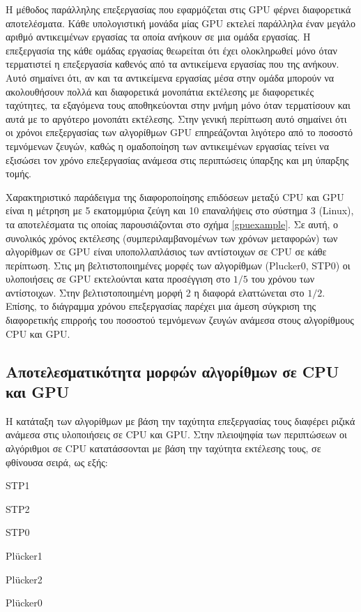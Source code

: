 Η μέθοδος παράλληλης επεξεργασίας που εφαρμόζεται στις GPU φέρνει διαφορετικά αποτελέσματα. Κάθε υπολογιστική μονάδα μίας GPU εκτελεί παράλληλα έναν μεγάλο αριθμό αντικειμένων εργασίας τα οποία ανήκουν σε μια ομάδα εργασίας. Η επεξεργασία της κάθε ομάδας εργασίας θεωρείται ότι έχει ολοκληρωθεί μόνο όταν τερματιστεί η επεξεργασία καθενός από τα αντικείμενα εργασίας που της ανήκουν. Αυτό σημαίνει ότι, αν και τα αντικείμενα εργασίας μέσα στην ομάδα μπορούν να ακολουθήσουν πολλά και διαφορετικά μονοπάτια εκτέλεσης με διαφορετικές ταχύτητες, τα εξαγόμενα τους αποθηκεύονται στην μνήμη μόνο όταν τερματίσουν και αυτά με το αργότερο μονοπάτι εκτέλεσης. Στην γενική περίπτωση αυτό σημαίνει ότι οι χρόνοι επεξεργασίας των αλγορίθμων GPU επηρεάζονται λιγότερο από το ποσοστό τεμνόμενων ζευγών, καθώς η ομαδοποίηση των αντικειμένων εργασίας τείνει να εξισώσει τον χρόνο επεξεργασίας ανάμεσα στις περιπτώσεις ύπαρξης και μη ύπαρξης τομής. 

Χαρακτηριστικό παράδειγμα της διαφοροποίησης επιδόσεων μεταξύ CPU και GPU είναι η μέτρηση με 5 εκατομμύρια ζεύγη και 10 επαναλήψεις στο σύστημα 3 (Linux), τα αποτελέσματα τις οποίας παρουσιάζονται στο σχήμα \ref{gpuexample}. Σε αυτή, ο συνολικός χρόνος εκτέλεσης (συμπεριλαμβανομένων των χρόνων μεταφορών) των αλγορίθμων σε GPU είναι υποπολλαπλάσιος των αντίστοιχων σε CPU σε κάθε περίπτωση. Στις μη βελτιστοποιημένες μορφές των αλγορίθμων (Plucker0, STP0) οι υλοποιήσεις σε GPU εκτελούνται κατα προσέγγιση στο $1/5$ του χρόνου των αντίστοιχων. Στην βελτιστοποιημένη μορφή 2 η διαφορά ελαττώνεται στο $1/2$. Επίσης, το διάγραμμα χρόνου επεξεργασίας παρέχει μια άμεση σύγκριση της διαφορετικής επιρροής του ποσοστού τεμνόμενων ζευγών ανάμεσα στους αλγορίθμους CPU και GPU.

\subsection{Αποτελεσματικότητα μορφών αλγορίθμων σε CPU και GPU}
\label{chapter:bench_algs}
\noindent Η κατάταξη των αλγορίθμων με βάση την ταχύτητα επεξεργασίας τους διαφέρει ριζικά ανάμεσα στις υλοποιήσεις σε CPU και GPU. Στην πλειοψηφία των περιπτώσεων οι αλγόριθμοι σε CPU κατατάσσονται με βάση την ταχύτητα εκτέλεσης τους, σε φθίνουσα σειρά, ως εξής:

\begin{enumerate*}
\item STP1
\item STP2
\item STP0
\item Plücker1
\item Plücker2
\item Plücker0
\end{enumerate*}

